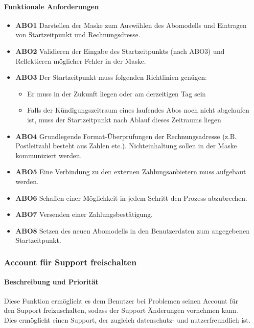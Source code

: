 \paragraph{Funktionale Anforderungen}
\begin{itemize}
	\item \textbf{ABO1} Darstellen der Maske zum Auswählen des Abomodells und Eintragen von Startzeitpunkt
	      und Rechnungsdresse.
	\item \textbf{ABO2} Validieren der Eingabe des Startzeitpunkts (nach ABO3) und Reflektieren möglicher
	      Fehler in der Maske.
	\item \textbf{ABO3} Der Startzeitpunkt muss folgenden Richtlinien genügen:
	      \begin{itemize}
		      \item Er muss in der Zukunft liegen oder am derzeitigen Tag sein
		      \item Falls der Kündigungszeitraum eines laufendes Abos noch nicht abgelaufen ist,
		            muss der Startzeitpunkt nach Ablauf dieses Zeitraums liegen
	      \end{itemize}
	\item \textbf{ABO4} Grundlegende Format-Überprüfungen der Rechnungsadresse
	      (z.B. Postleitzahl besteht aus Zahlen etc.).
	      Nichteinhaltung sollen in der Maske kommuniziert werden.
	\item \textbf{ABO5} Eine Verbindung zu den externen Zahlungsanbietern muss aufgebaut werden.
	\item \textbf{ABO6} Schaffen einer Möglichkeit in jedem Schritt den Prozess abzubrechen.
	\item \textbf{ABO7} Versenden einer Zahlungsbestätigung.
	\item \textbf{ABO8} Setzen des neuen Abomodells in den Benutzerdaten zum angegebenen Startzeitpunkt.
\end{itemize}


\subsubsection{Account für Support freischalten}
\label{sys_feat:freischalten}
\paragraph{Beschreibung und Priorität}
Diese Funktion ermöglicht es dem Benutzer bei Problemen seinen Account für den Support freizuschalten,
sodass der Support Änderungen vornehmen kann.
Dies ermöglicht einen Support, der zugleich datenschutz- und nutzerfreundlich ist.
